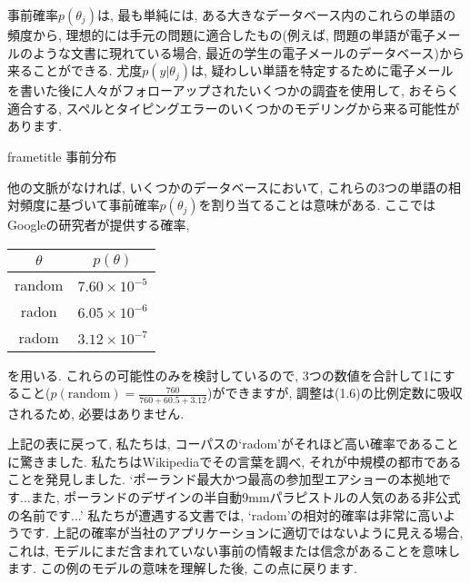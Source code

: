 \documentclass[10pt,dvipdfmx,a4]{beamer}
\newcommand{\dbox}[1]{\begin{beamercolorbox}[wd=122mm, sep=0pt, shadow=false, rounded=false]{frametitle} { #1}\end{beamercolorbox}}
\begin{document}

\begin{frame}
事前確率$p(\theta_j)$は, 最も単純には, ある大きなデータベース内のこれらの単語の頻度から, 理想的には手元の問題に適合したもの(例えば, 問題の単語が電子メールのような文書に現れている場合, 最近の学生の電子メールのデータベース)から来ることができる.
尤度$p(y|\theta_j)$は, 疑わしい単語を特定するために電子メールを書いた後に人々がフォローアップされたいくつかの調査を使用して, おそらく適合する, スペルとタイピングエラーのいくつかのモデリングから来る可能性があります.
\end{frame}


\begin{frame}
\dbox{事前分布}
他の文脈がなければ, いくつかのデータベースにおいて, これらの3つの単語の相対頻度に基づいて事前確率$p(\theta_j)$を割り当てることは意味がある.
ここではGoogleの研究者が提供する確率,
\begin{table}[htb]
  \begin{tabular}{cc}
    $\theta$ & $p(\theta)$\\ \hline
    random & $7.60 \times 10^{-5}$  \\
    radon   & $6.05\times 10^{-6}$ \\
    radom   & $3.12\times10^{-7}$  \\
  \end{tabular}
\end{table}
を用いる.
これらの可能性のみを検討しているので, 3つの数値を合計して1にすること($p(\text{random})=\tfrac{760}{760+60.5+3.12}$)ができますが, 調整は(1.6)の比例定数に吸収されるため, 必要はありません.
\end{frame}


\begin{frame}
上記の表に戻って, 私たちは, コーパスの`radom'がそれほど高い確率であることに驚きました.
私たちはWikipediaでその言葉を調べ, それが中規模の都市であることを発見しました.
`ポーランド最大かつ最高の参加型エアショーの本拠地です...また, ポーランドのデザインの半自動9mmパラピストルの人気のある非公式の名前です...'
私たちが遭遇する文書では, `radom'の相対的確率は非常に高いようです.
上記の確率が当社のアプリケーションに適切ではないように見える場合, これは, モデルにまだ含まれていない事前の情報または信念があることを意味します.
この例のモデルの意味を理解した後, この点に戻ります.
\end{frame}
\end{document}
